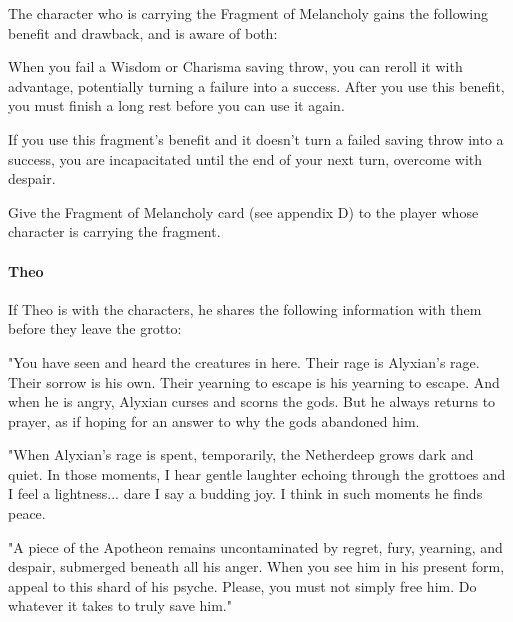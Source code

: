 \documentclass[10pt,a4paper,twoside,twocolumn,openany,nodeprecatedcode]{dndbook}
\begin{document}
The character who is carrying the Fragment of Melancholy gains the following benefit and drawback, and is aware of both:

\begin{DndComment}{}

\begin{description}[nolistsep]
\item[Benefit.]
When you fail a Wisdom or Charisma saving throw, you can reroll it with advantage, potentially turning a failure into a success. After you use this benefit, you must finish a long rest before you can use it again.
\item[Drawback.]
If you use this fragment's benefit and it doesn't turn a failed saving throw into a success, you are incapacitated until the end of your next turn, overcome with despair.
\end{description}



\end{DndComment}

Give the Fragment of Melancholy card (see appendix D) to the player whose character is carrying the fragment.

\paragraph{Theo}
If Theo is with the characters, he shares the following information with them before they leave the grotto:

\begin{DndReadAloud}{}
"You have seen and heard the creatures in here. Their rage is Alyxian's rage. Their sorrow is his own. Their yearning to escape is his yearning to escape. And when he is angry, Alyxian curses and scorns the gods. But he always returns to prayer, as if hoping for an answer to why the gods abandoned him.

"When Alyxian's rage is spent, temporarily, the Netherdeep grows dark and quiet. In those moments, I hear gentle laughter echoing through the grottoes and I feel a lightness... dare I say a budding joy. I think in such moments he finds peace.

"A piece of the Apotheon remains uncontaminated by regret, fury, yearning, and despair, submerged beneath all his anger. When you see him in his present form, appeal to this shard of his psyche. Please, you must not simply free him. Do whatever it takes to truly save him."

\end{DndReadAloud}
\end{document}
